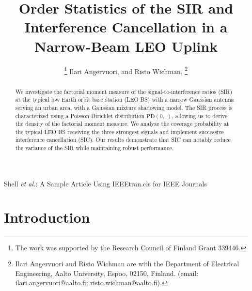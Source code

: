 \documentclass[lettersize,journal]{IEEEtran}
\begin{document}
\title{Order Statistics of the SIR and Interference Cancellation in a Narrow-Beam LEO Uplink}
\author{
  \thanks{The work was supported by the Research Council of Finland Grant 339446.}
   Ilari Angervuori,   and Risto Wichman,  \thanks{Ilari Angervuori and Risto Wichman are with the Department of Electrical Engineering, Aalto University, Espoo, 02150, Finland. (email: ilari.angervuori@aalto.fi; risto.wichman@aalto.fi).}
 }

%
{Shell \MakeLowercase{\textit{et al.}}: A Sample Article Using IEEEtran.cls for IEEE Journals}

\IEEEpubid{}


\maketitle
\begin{abstract}
We investigate the factorial moment measure of the signal-to-interference ratios (SIR) at the typical low Earth orbit base station (LEO BS) with a narrow Gaussian antenna serving an urban area, with a Gaussian mixture shadowing model. The SIR process is characterized using a Poisson-Dirichlet distribution $\text{PD}(0, \cdot)$, allowing us to derive the density of the factorial moment measure. We analyze the coverage probability at the typical LEO BS receiving the three strongest signals and implement successive interference cancellation (SIC). Our results demonstrate that SIC can notably reduce the variance of the SIR while maintaining robust performance.
\end{abstract}



\section{Introduction}
\end{document}
